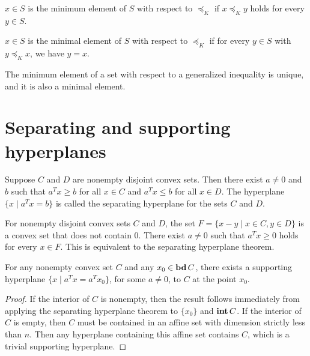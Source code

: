 \documentclass[12pt]{article}
\begin{document}
\begin{definition}
    \(x\in S\) is the \textnormal{minimum element} of \(S\) with respect to \(\preceq_K\) if \(x\preceq_K y\) holds for every \(y\in S\).
\end{definition}

\begin{definition}
    \(x\in S\) is the \textnormal{minimal element} of \(S\) with respect to \(\preceq_K\) if for every \(y\in S\) with \(y\preceq_K x\), we have \(y=x\).
\end{definition}

\begin{remark}
    The minimum element of a set with respect to a generalized inequality is unique, and it is also a minimal element.
\end{remark}

\section{Separating and supporting hyperplanes}

\begin{theorem}
    Suppose \(C\) and \(D\) are nonempty disjoint convex sets. Then there exist \(a\neq 0\) and \(b\) such that \(a^Tx\geqslant b\) for all \(x\in C\) and \(a^Tx\leqslant b\) for all \(x\in D\). The hyperplane \(\{x\mid a^Tx=b\}\) is called the \textnormal{separating hyperplane} for the sets \(C\) and \(D\).
\end{theorem}

\begin{proposition}\label{separating-hyperplane-expr2}
    For nonempty disjoint convex sets \(C\) and \(D\), the set \(F=\{x-y\mid x\in C,y\in D\}\) is a convex set that does not contain \(0\). There exist \(a\neq 0\) such that \(a^Tx\geqslant 0\) holds for every \(x\in F\). This is equivalent to the separating hyperplane theorem.
\end{proposition}

\begin{theorem}
    For any nonempty convex set \(C\) and any \(x_0\in\operatorname{\mathbf{bd}} C\), there exists a supporting hyperplane \(\{x\mid a^Tx=a^Tx_0\}\), for some \(a\neq 0\), to \(C\) at the point \(x_0\).
\end{theorem}
\begin{proof}
    If the interior of \(C\) is nonempty, then the result follows immediately from applying the separating hyperplane theorem to \(\{x_0\}\) and \(\operatorname{\mathbf{int}} C\). If the interior of \(C\) is empty, then \(C\) must be contained in an affine set with dimension strictly less than \(n\). Then any hyperplane containing this affine set contains \(C\), which is a trivial supporting hyperplane.
\end{proof}
\end{document}
